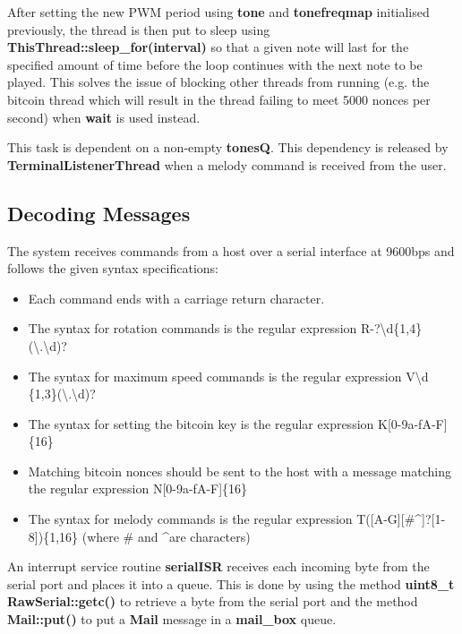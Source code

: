 \documentclass{article}
\begin{document}
\bigskip

After setting the new PWM period using \textbf{tone} and \textbf{tonefreqmap} initialised previously, the thread is then put to sleep using \textbf{ThisThread::sleep\_for(interval)} so that a given note will last for the specified amount of time before the loop continues with the next note to be played. This solves the issue of blocking other threads from running (e.g. the bitcoin thread which will result in the thread failing to meet 5000 nonces per second) when \textbf{wait} is used instead.   

\bigskip

This task is dependent on a non-empty \textbf{tonesQ}. This dependency is released by \textbf{TerminalListenerThread} when a melody command is received from the user. 

\subsection{Decoding Messages}

\noindent The system receives commands from a host over a serial interface at 9600bps and follows the given syntax specifications:

 \begin{itemize}
	\item Each command ends with a carriage return character.
	\item The syntax for rotation commands is the regular expression R-?\textbackslash{}d\{1,4\}(\textbackslash{}.\textbackslash{}d)?
	\item The syntax for maximum speed commands is the regular expression V\textbackslash d \{1,3\}(\textbackslash{}.\textbackslash{}d)?
	\item The syntax for setting the bitcoin key is the regular expression K[0-9a-fA-F]\{16\}
	\item Matching bitcoin nonces should be sent to the host with a message matching the regular expression N[0-9a-fA-F]\{16\}
	\item The syntax for melody commands is the regular expression T([A-G][\#\textasciicircum{}]?[1-8])\{1,16\} (where \# and \textasciicircum{}are characters)
	
\end{itemize}

An interrupt service routine \textbf{serialISR} receives each incoming byte from the serial port and places it into a queue. This is done by using the method \textbf{uint8\_t RawSerial::getc()} to retrieve a byte from the serial port and the method \textbf{Mail::put()} to put a \textbf{Mail} message in a \textbf{mail\_box} queue.
\bigskip
\end{document}
